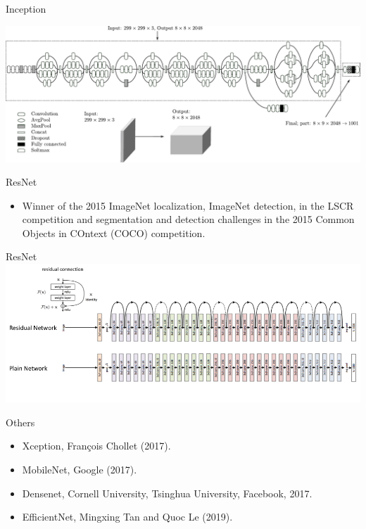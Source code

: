 \documentclass{beamer}
\begin{document}
\begin{frame}{Inception}

 \includegraphics[width=\textwidth]{Module 4 (CNN)/pics/inception-v3.pdf}
    
\end{frame}
\begin{frame}{ResNet}
    \begin{itemize}
        \item Winner of the 2015 ImageNet localization, ImageNet detection, in the LSCR competition and segmentation and detection challenges in the 2015 Common Objects in COntext (COCO) competition.   
    \end{itemize}
\end{frame}

\begin{frame}{ResNet}
        \includegraphics[width=\textwidth]{Module 4 (CNN)/pics/resnet-34.png}
\end{frame}

\begin{frame}{Others}
    \begin{itemize}
    \item Xception, Fran{\c c}ois Chollet (2017).
    \item MobileNet, Google (2017).
    \item Densenet, Cornell University, Tsinghua University, Facebook, 2017.
    \item EfficientNet, Mingxing Tan and Quoc Le (2019).
    
    \end{itemize}
\end{frame}
\end{document}
